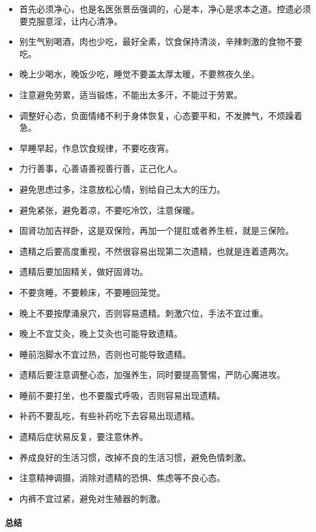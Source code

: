 \begin{itemize}
    \item 首先必须净心，也是名医张景岳强调的，心是本，净心是求本之道。控遗必须要克服意淫，让内心清净。
    \item 别生气别喝酒，肉也少吃，最好全素，饮食保持清淡，辛辣刺激的食物不要吃。
    \item 晚上少喝水，晚饭少吃，睡觉不要盖太厚太暖，不要熬夜久坐。
    \item 注意避免劳累，适当锻炼，不能出太多汗，不能过于劳累。
    \item 调整好心态，负面情绪不利于身体恢复，心态要平和，不发脾气，不烦躁着急。
    \item 早睡早起，作息饮食规律，不要吃夜宵。
    \item 力行善事，心善语善视善行善，正己化人。
    \item 避免思虑过多，注意放松心情，别给自己太大的压力。
    \item 避免紧张，避免着凉，不要吃冷饮，注意保暖。
    \item 固肾功加吉祥卧，这是双保险，再加一个提肛或者养生桩，就是三保险。
    \item 遗精之后要高度重视，不然很容易出现第二次遗精，也就是连着遗两次。
    \item 遗精后要加固精关，做好固肾功。
    \item 不要贪睡，不要赖床，不要睡回笼觉。
    \item 晚上不要按摩涌泉穴，否则容易遗精。刺激穴位，手法不宜过重。
    \item 晚上不宜艾灸，晚上艾灸也可能导致遗精。
    \item 睡前泡脚水不宜过热，否则也可能导致遗精。
    \item 遗精后要注意调整心态，加强养生，同时要提高警惕，严防心魔进攻。
    \item 睡前不要打坐，也不要腹式呼吸，否则容易出现遗精。
    \item 补药不要乱吃，有些补药吃下去容易出现遗精。
    \item 遗精后症状易反复，要注意休养。
    \item 养成良好的生活习惯，改掉不良的生活习惯，避免色情刺激。
    \item 注意精神调摄，消除对遗精的恐惧、焦虑等不良心态。
    \item 内裤不宜过紧，避免对生殖器的刺激。
\end{itemize}

\paragraph*{总结}

